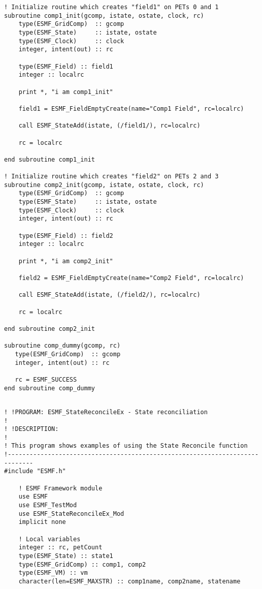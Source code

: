 \begin{verbatim}
! Initialize routine which creates "field1" on PETs 0 and 1
subroutine comp1_init(gcomp, istate, ostate, clock, rc)
    type(ESMF_GridComp)  :: gcomp
    type(ESMF_State)     :: istate, ostate
    type(ESMF_Clock)     :: clock
    integer, intent(out) :: rc

    type(ESMF_Field) :: field1
    integer :: localrc

    print *, "i am comp1_init"

    field1 = ESMF_FieldEmptyCreate(name="Comp1 Field", rc=localrc)
  
    call ESMF_StateAdd(istate, (/field1/), rc=localrc)
    
    rc = localrc

end subroutine comp1_init

! Initialize routine which creates "field2" on PETs 2 and 3
subroutine comp2_init(gcomp, istate, ostate, clock, rc)
    type(ESMF_GridComp)  :: gcomp
    type(ESMF_State)     :: istate, ostate
    type(ESMF_Clock)     :: clock
    integer, intent(out) :: rc

    type(ESMF_Field) :: field2
    integer :: localrc

    print *, "i am comp2_init"

    field2 = ESMF_FieldEmptyCreate(name="Comp2 Field", rc=localrc)
    
    call ESMF_StateAdd(istate, (/field2/), rc=localrc)

    rc = localrc

end subroutine comp2_init

subroutine comp_dummy(gcomp, rc)
   type(ESMF_GridComp)  :: gcomp
   integer, intent(out) :: rc

   rc = ESMF_SUCCESS
end subroutine comp_dummy
 
\end{verbatim}
 

 \begin{verbatim}
! !PROGRAM: ESMF_StateReconcileEx - State reconciliation
!
! !DESCRIPTION:
!
! This program shows examples of using the State Reconcile function
!-----------------------------------------------------------------------------
#include "ESMF.h"

    ! ESMF Framework module
    use ESMF
    use ESMF_TestMod
    use ESMF_StateReconcileEx_Mod
    implicit none

    ! Local variables
    integer :: rc, petCount
    type(ESMF_State) :: state1
    type(ESMF_GridComp) :: comp1, comp2
    type(ESMF_VM) :: vm
    character(len=ESMF_MAXSTR) :: comp1name, comp2name, statename

 
\end{verbatim}
 

